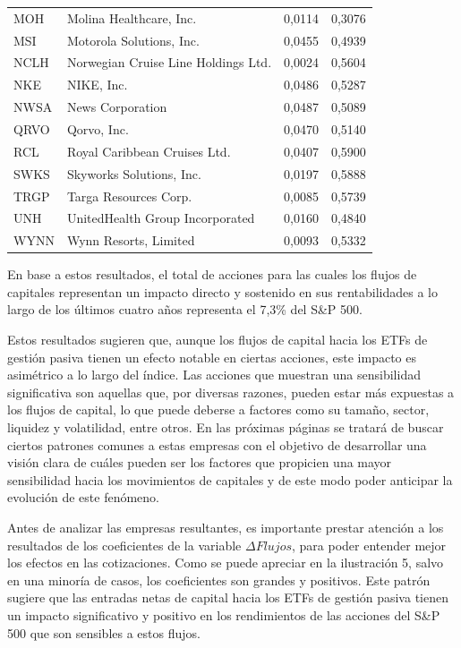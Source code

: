 \documentclass[12pt,a4paper]{article}
\begin{document}
\begin{table}[H]
\begin{tabular}{p{1.5cm}p{6cm}p{2cm}p{1.5cm}}
MOH & Molina Healthcare, Inc. & 0,0114 & 0,3076 \\
MSI & Motorola Solutions, Inc. & 0,0455 & 0,4939 \\
NCLH & Norwegian Cruise Line Holdings Ltd. & 0,0024 & 0,5604 \\
NKE & NIKE, Inc. & 0,0486 & 0,5287 \\
NWSA & News Corporation & 0,0487 & 0,5089 \\
QRVO & Qorvo, Inc. & 0,0470 & 0,5140 \\
RCL & Royal Caribbean Cruises Ltd. & 0,0407 & 0,5900 \\
SWKS & Skyworks Solutions, Inc. & 0,0197 & 0,5888 \\
TRGP & Targa Resources Corp. & 0,0085 & 0,5739 \\
UNH & UnitedHealth Group Incorporated & 0,0160 & 0,4840 \\
WYNN & Wynn Resorts, Limited & 0,0093 & 0,5332 \\
\bottomrule
\end{tabular}
\end{table}

En base a estos resultados, el total de acciones para las cuales los flujos de capitales representan un impacto directo y sostenido en sus rentabilidades a lo largo de los últimos cuatro años representa el 7,3\% del S\&P 500.

Estos resultados sugieren que, aunque los flujos de capital hacia los ETFs de gestión pasiva tienen un efecto notable en ciertas acciones, este impacto es asimétrico a lo largo del índice. Las acciones que muestran una sensibilidad significativa son aquellas que, por diversas razones, pueden estar más expuestas a los flujos de capital, lo que puede deberse a factores como su tamaño, sector, liquidez y volatilidad, entre otros. En las próximas páginas se tratará de buscar ciertos patrones comunes a estas empresas con el objetivo de desarrollar una visión clara de cuáles pueden ser los factores que propicien una mayor sensibilidad hacia los movimientos de capitales y de este modo poder anticipar la evolución de este fenómeno.

Antes de analizar las empresas resultantes, es importante prestar atención a los resultados de los coeficientes de la variable $\Delta Flujos$, para poder entender mejor los efectos en las cotizaciones. Como se puede apreciar en la ilustración 5, salvo en una minoría de casos, los coeficientes son grandes y positivos. Este patrón sugiere que las entradas netas de capital hacia los ETFs de gestión pasiva tienen un impacto significativo y positivo en los rendimientos de las acciones del S\&P 500 que son sensibles a estos flujos.
\end{document}
